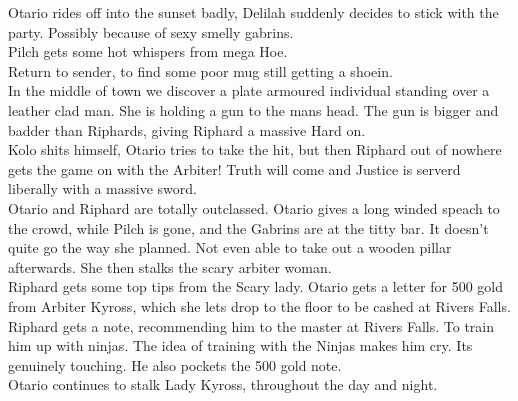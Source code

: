 Otario rides off into the sunset badly, Delilah suddenly decides to stick with the party. Possibly because of sexy smelly gabrins.\\
Pilch gets some hot whispers from mega Hoe.\\
Return to sender, to find some poor mug still getting a shoein.\\
In the middle of town we discover a plate armoured individual standing over a leather clad man. She is holding a gun to the mans head. The gun is bigger and badder than Riphards, giving Riphard a massive Hard on.\\
Kolo shits himself, Otario tries to take the hit, but then Riphard out of nowhere gets the game on with the Arbiter! Truth will come and Justice is serverd liberally with a massive sword.\\
Otario and Riphard are totally outclassed. Otario gives a long winded speach to the crowd, while Pilch is gone, and the Gabrins are at the titty bar. It doesn’t quite go the way she planned. Not even able to take out a wooden pillar afterwards. She then stalks the scary arbiter woman.\\
Riphard gets some top tips from the Scary lady. Otario gets a letter for 500 gold from Arbiter Kyross, which she lets drop to the floor to be cashed at Rivers Falls.\\
Riphard gets a note, recommending him to the master at Rivers Falls. To train him up with ninjas. The idea of training with the Ninjas makes him cry. Its genuinely touching. He also pockets the 500 gold note.\\
Otario continues to stalk Lady Kyross, throughout the day and night.\\